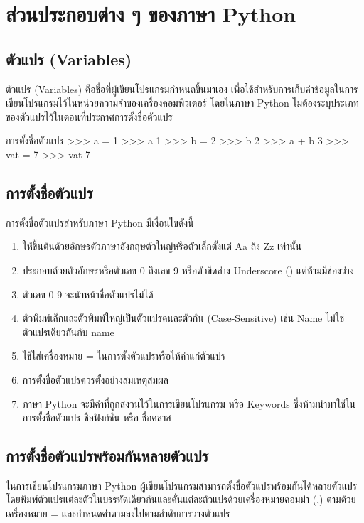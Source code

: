 \chapter{ส่วนประกอบต่าง ๆ ของภาษา Python}

\section{ตัวแปร (Variables)}

ตัวแปร (Variables) คือชื่อที่ผู้เขียนโปรแกรมกำหนดขึ้นมาเอง เพื่อใช้สำหรับการเก็บค่าข้อมูลในการเขียนโปรแกรมไว้ในหน่วยความจำของเครื่องคอมพิวเตอร์ โดยในภาษา Python ไม่ต้องระบุประเภทของตัวแปรไว้ในตอนที่ประกาศการตั้งชื่อตัวแปร

\begin{codelist}{การตั้งชื่อตัวแปร}{}
>>> a = 1
>>> a
1
>>> b = 2
>>> b
2
>>> a + b
3
>>> vat = 7
>>> vat
7
\end{codelist}

\section{การตั้งชื่อตัวแปร}

การตั้งชื่อตัวแปรสำหรับภาษา Python มีเงื่อนไขดังนี้

\begin{enumerate}[noitemsep]
\item ให้ขึ้นต้นด้วยอักษรตัวภาษาอังกฤษตัวใหญ่หรือตัวเล็กตั้งแต่ Aa ถึง Zz เท่านั้น 
\item ประกอบด้วยตัวอักษรหรือตัวเลข 0 ถึงเลข 9 หรือตัวขีดล่าง Underscore (\pyinline{_}) แต่ห้ามมีช่องว่าง
\item ตัวเลข 0-9 จะนำหน้าชื่อตัวแปรไม่ได้
\item ตัวพิมพ์เล็กและตัวพิมพ์ใหญ่เป็นตัวแปรคนละตัวกัน (Case-Sensitive) เช่น Name ไม่ใช่ตัวแปรเดียวกันกับ name 
\item ใช้ใส่เครื่องหมาย = ในการตั้งตัวแปรหรือให้ค่าแก่ตัวแปร
\item การตั้งชื่อตัวแปรควรตั้งอย่างสมเหตุสมผล 
\item ภาษา Python จะมีคำที่ถูกสงวนไว้ในการเขียนโปรแกรม หรือ Keywords ซึ่งห้ามนำมาใช้ในการตั้งชื่อตัวแปร ชื่อฟังก์ชัน หรือ ชื่อคลาส 
\end{enumerate}

\section{การตั้งชื่อตัวแปรพร้อมกันหลายตัวแปร}

ในการเขียนโปรแกรมภาษา Python ผู้เขียนโปรแกรมสามารถตั้งชื่อตัวแปรพร้อมกันได้หลายตัวแปร โดยพิมพ์ตัวแปรแต่ละตัวในบรรทัดเดียวกันและคั่นแต่ละตัวแปรด้วยเครื่องหมายคอมม่า (,) ตามด้วยเครื่องหมาย = และกำหนดค่าตามลงไปตามลำดับการวางตัวแปร

